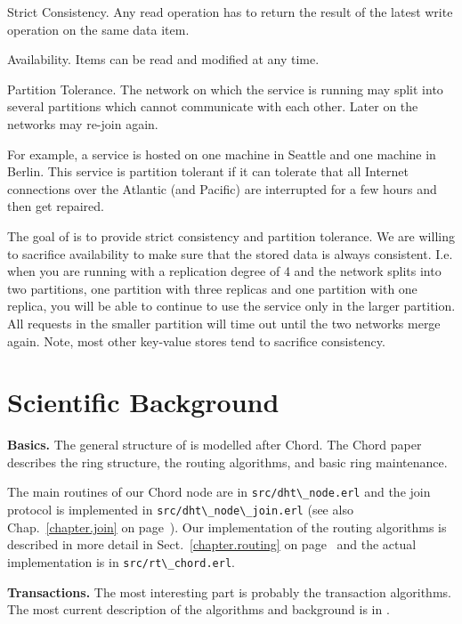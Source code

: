 \documentclass[a4paper]{scrreprt}
\newcommand{\sieheref}[1]{\ref{#1} on page~\pageref{#1}}
\newcommand{\code}[1]{\lstinline[basicstyle=\ttfamily]!#1!}
\begin{document}
\begin{description}
\item {Strict Consistency.} Any read operation has to return the
  result of the latest write operation on the same data item.

\item {Availability.} Items can be read and modified at any time.

\item {Partition Tolerance.} The network on which the service is
  running may split into several partitions which cannot communicate
  with each other. Later on the networks may re-join again.

  For example, a service is hosted on one machine in Seattle and one
  machine in Berlin. This service is partition tolerant if it can
  tolerate that all Internet connections over the Atlantic (and
  Pacific) are interrupted for a few hours and then get repaired.
\end{description}

The goal of \scalaris{} is to provide strict consistency and partition
tolerance. We are willing to sacrifice availability to make sure that
the stored data is always consistent. I.e. when you are running
\scalaris{} with a replication degree of 4 and the network splits into
two partitions, one partition with three replicas and one partition
with one replica, you will be able to continue to use the service only
in the larger partition. All requests in the smaller partition will
time out until the two networks merge again. Note, most other
key-value stores tend to sacrifice consistency.

\section{Scientific Background}

{\bf Basics.} The general structure of \scalaris{} is modelled after
Chord. The Chord paper~\cite{chord-sigcomm} describes the ring
structure, the routing algorithms, and basic ring maintenance.

The main routines of our Chord node are in \code{src/dht\_node.erl} and
the join protocol is implemented in \code{src/dht\_node\_join.erl} (see
also Chap.~\sieheref{chapter.join}). Our implementation of the routing
algorithms is described in more detail in Sect.~\sieheref{chapter.routing}
and the actual implementation is in \code{src/rt\_chord.erl}.

{\bf Transactions.} The most interesting part is probably the
transaction algorithms. The most current description of the algorithms
and background is in \cite{enhanced-paxos}.
\end{document}
